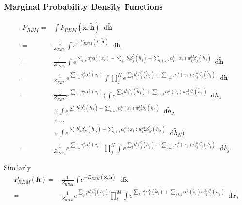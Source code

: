 \documentclass[twoside,english]{uiofysmaster}
\newcommand*\dif{\mathop{}\!\mathrm{d}}
\begin{document}

\subsubsection{Marginal Probability Density Functions}
\begin{align}
	P_{RBM} =& \int P_{RBM} (\bm{x}, \tilde{\bm{h}}) \dif \tilde{\bm{h}} \nonumber \\
	=& \frac{1}{Z_{RBM}} \int e^{-E_{RBM} (\bm{x}, \tilde{\bm{h}}) } \dif \tilde{\bm{h}} \nonumber \\
	=& \frac{1}{Z_{RBM}} \int e^{\sum_{i, k} a_i^k \alpha_i^k (x_i)
	+ \sum_{j, l} b_j^l \beta_j^l (\tilde{h}_j) 
	+ \sum_{i,j,k,l} \alpha_i^k (x_i) w_{ij}^{kl} \beta_j^l (\tilde{h}_j)} 
	\dif \tilde{\bm{h}} \nonumber \\
	=& \frac{1}{Z_{RBM}} e^{\sum_{i, k} a_i^k \alpha_i^k (x_i)}
	\int \prod_j^N e^{\sum_l b_j^l \beta_j^l (\tilde{h}_j) 
	+ \sum_{i,k,l} \alpha_i^k (x_i) w_{ij}^{kl} \beta_j^l (\tilde{h}_j)} \dif \tilde{\bm{h}} \nonumber \\
	=& \frac{1}{Z_{RBM}} e^{\sum_{i, k} a_i^k \alpha_i^k (x_i)}
	\biggl( \int e^{\sum_l b_1^l \beta_1^l (\tilde{h}_1) + \sum_{i,k,l} \alpha_i^k (x_i) w_{i1}^{kl} \beta_1^l (\tilde{h}_1)} \dif  \tilde{h}_1 \nonumber \\
	& \times \int e^{\sum_l b_2^l \beta_2^l (\tilde{h}_2) + \sum_{i,k,l} \alpha_i^k (x_i) w_{i2}^{kl} \beta_2^l (\tilde{h}_2)} \dif  \tilde{h}_2 \nonumber \\
	& \times ... \nonumber \\
	& \times \int e^{\sum_l b_N^l \beta_N^l (\tilde{h}_N) + \sum_{i,k,l} \alpha_i^k (x_i) w_{iN}^{kl} \beta_N^l (\tilde{h}_N)} \dif  \tilde{h}_N \biggr) \nonumber \\
	=& \frac{1}{Z_{RBM}} e^{\sum_{i, k} a_i^k \alpha_i^k (x_i)}
	\prod_j^N \int e^{\sum_l b_j^l \beta_j^l (\tilde{h}_j) + \sum_{i,k,l} \alpha_i^k (x_i) w_{ij}^{kl} \beta_j^l (\tilde{h}_j)}  \dif \tilde{h}_j
\end{align}

Similarly
\begin{align}
	P_{RBM} (\bm{h}) =& \frac{1}{Z_{RBM}} \int e^{-E_{RBM} (\tilde{\bm{x}}, \bm{h})} \dif \tilde{\bm{x}} \nonumber \\
	=& \frac{1}{Z_{RBM}} e^{\sum_{j, l} b_j^l \beta_j^l (h_j)}
	\prod_i^M \int e^{\sum_k a_i^k \alpha_i^k (\tilde{x}_i)
	+ \sum_{j,k,l} \alpha_i^k (\tilde{x}_i) w_{ij}^{kl} \beta_j^l (h_j)} \dif \tilde{x}_i
\end{align}
\end{document}
